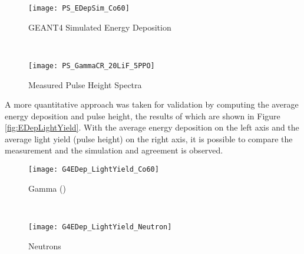 \documentclass[draftcls,onecolumn]{IEEEtran}
\begin{document}
\begin{figure*}[ht]
	\centering
	\begin{subfigure}[b]{0.45\textwidth}
    		\texttt{[image: PS\_EDepSim\_Co60]}
		\caption{GEANT4 Simulated Energy Deposition}
	\end{subfigure}%
	~
	\begin{subfigure}[b]{0.45\textwidth}
    \texttt{[image: PS\_GammaCR\_20LiF\_5PPO]}
		\caption{Measured Pulse Height Spectra}
	\end{subfigure}%
	\caption{Comparison of the energy deposition and pulse height spectra for validation. The spectra have the same shape, indicating agreement. The fabricated films greater than \SI{600}{\um} were of poor optical quality and therefore their results are not shown.}
	\label{fig:spectraComparisonGamma}
\end{figure*}
A more quantitative approach was taken for validation by computing the average energy deposition and pulse height, the results of which are shown in Figure \ref{fig:EDepLightYield}. 
With the average energy deposition on the left axis and the average light yield (pulse height) on the right axis, it is possible to compare the measurement and the simulation and agreement is observed.
\begin{figure*}[ht]
	\centering
	\begin{subfigure}[b]{0.45\textwidth}
    		\texttt{[image: G4EDep\_LightYield\_Co60]}
		\caption{Gamma ()}
	\end{subfigure}%
	~
	\begin{subfigure}[b]{0.45\textwidth}
    		\texttt{[image: G4EDep\_LightYield\_Neutron]}
		\caption{Neutrons}
	\end{subfigure}%
	\caption{Average Energy Deposition and Measured Light Yield}
	\label{fig:EDepLightYield}
\end{figure*}
\end{document}
